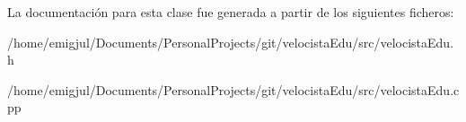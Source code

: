 La documentación para esta clase fue generada a partir de los siguientes ficheros\-:\begin{DoxyCompactItemize}
\item 
/home/emigjul/\-Documents/\-Personal\-Projects/git/velocista\-Edu/src/velocista\-Edu.\-h\item 
/home/emigjul/\-Documents/\-Personal\-Projects/git/velocista\-Edu/src/velocista\-Edu.\-cpp\end{DoxyCompactItemize}
